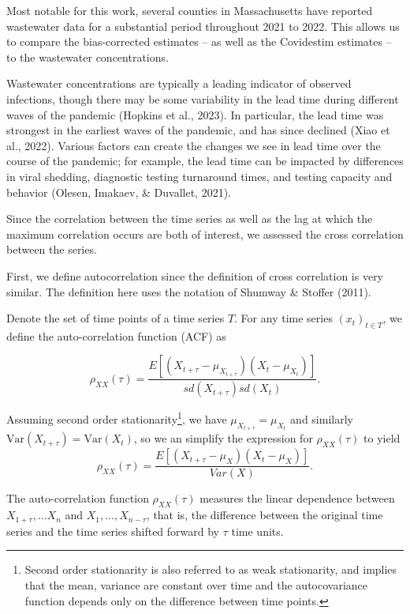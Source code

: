 \documentclass[12pt,twoside]{smiththesis}
\begin{document}
Most notable for this work, several counties in Massachusetts have reported wastewater data for a substantial period throughout 2021 to 2022. This allows us to compare the bias-corrected estimates -- as well as the Covidestim estimates -- to the wastewater concentrations.

Wastewater concentrations are typically a leading indicator of observed infections, though there may be some variability in the lead time during different waves of the pandemic (Hopkins et al., 2023). In particular, the lead time was strongest in the earliest waves of the pandemic, and has since declined (Xiao et al., 2022). Various factors can create the changes we see in lead time over the course of the pandemic; for example, the lead time can be impacted by differences in viral shedding, diagnostic testing turnaround times, and testing capacity and behavior (Olesen, Imakaev, \& Duvallet, 2021).

Since the correlation between the time series as well as the lag at which the maximum correlation occurs are both of interest, we assessed the cross correlation between the series.

First, we define autocorrelation since the definition of cross correlation is very similar. The definition here uses the notation of Shumway \& Stoffer (2011).
\begin{tcolorbox}[title=Definition: Autocorrelation]

Denote the set of time points of a time series $T$. For any time series $(x_t)_{t\in T}$, we define the auto-correlation function (ACF)  as 

$$\rho_{XX}(\tau) = \dfrac{E[(X_{t + \tau} - \mu_{X_{t+\tau}}) (X_t - \mu_{X_t})]}{sd(X_{t+\tau}) sd(X_t)}.$$
\end{tcolorbox}
Assuming second order stationarity\footnote{Second order stationarity is also referred to as weak stationarity, and implies that the mean, variance are constant over time and the autocovariance function depends only on the difference between time points.}, we have \(\mu_{X_{t+\tau}}=\mu_{X_{t}}\)
and similarly \(\text{Var}({X_{t+\tau}})=\text{Var}({X_{t}})\), so we an simplify the expression for \(\rho_{XX} (\tau)\) to yield\\
\[\rho_{XX} (\tau)=\dfrac{E[(X_{t + \tau} - \mu_{X}) (X_t - \mu_{X})]}{Var(X)}.\]

The auto-correlation function \(\rho_{XX}(\tau)\) measures the linear dependence between \(X_{1+\tau}, \dots X_n\) and \(X_1, \dots, X_{n-\tau}\), that is, the difference between the original time series and the time series shifted forward by \(\tau\) time units.
\end{document}
